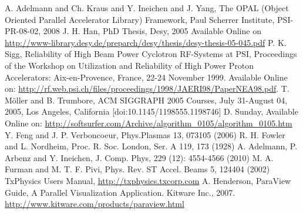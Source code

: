 \documentclass{JAC2003}
\begin{document}
\begin{thebibliography}{9}   %
 A. Adelmann and Ch. Kraus and Y. Ineichen and  J. Yang,
The OPAL (Object Oriented Parallel Accelerator Library) 
              Framework, Paul Scherrer Institute, PSI-PR-08-02, 2008
 J. H. Han, PhD Thesis, Desy, 2005 Available Online on \url{http://www-library.desy.de/preparch/desy/thesis/desy-thesis-05-045.pdf}
 P. K. Sigg, Reliability of High Beam Power Cyclotron RF-Systems at PSI, 
Proceedings of the Workshop on Utilization and Reliability of High Power Proton Accelerators: Aix-en-Provence, France, 22-24 November 1999. Available Online on: \url{http://rf.web.psi.ch/files/proceedings/1998/JAERI98/PaperNEA98.pdf}.
 T. M\"oller and B. Trumbore,
 ACM SIGGRAPH 2005 Courses, July 31-August 04, 2005, Los Angeles, California   [doi:10.1145/1198555.1198746] 
 D. Sunday,
 Available Online on: \url{http://softsurfer.com/Archive/algorithm_0105/algorithm_0105.htm}
 Y. Feng and J. P. Verboncoeur,
Phys.Plasmas 13, 073105 (2006)
 R. H. Fowler and L. Nordheim, 
Proc. R. Soc. London, Ser. A 119, 173 (1928)
 A. Adelmann, P. Arbenz and Y. Ineichen, 
J. Comp. Phys, 229 (12): 4554-4566 (2010)
 M. A. Furman and M. T. F. Pivi,  
Phys. Rev. ST Accel. Beams 5, 124404 (2002)
TxPhysics Users Manual, \url{http://txphysics.txcorp.com}
A. Henderson, ParaView Guide, A Parallel Visualization Application.
Kitware Inc., 2007. \url{http://www.kitware.com/products/paraview.html}
\end{thebibliography}
\end{document}

